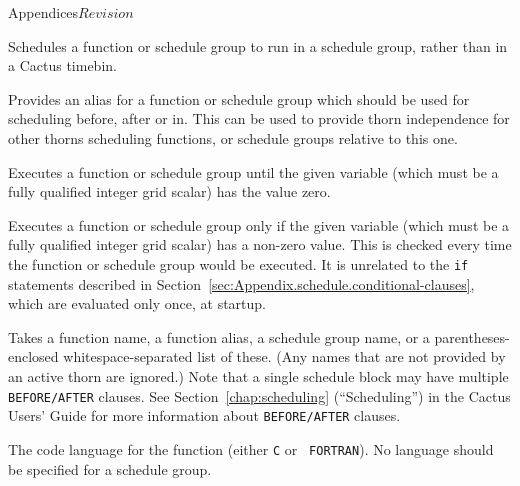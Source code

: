 \begin{cactuspart}{Appendices}{}{$Revision$}
\begin{Lentry}
  \item[{\tt IN}] Schedules a function or schedule group to run in a
  schedule group, rather than in a Cactus timebin.

  \item[{\tt AS}] Provides an alias for a function or schedule group
  which should be used for scheduling before, after or in.  This can
  be used to provide thorn independence for other thorns scheduling
  functions, or schedule groups relative to this one.

  \item[{\tt WHILE}] Executes a function or schedule group until the given
    variable (which must be a fully qualified integer grid scalar) has
    the value zero.

  \item[{\tt IF}] Executes a function or schedule group only if the given
    variable (which must be a fully qualified integer grid scalar) has
    a non-zero value. This is checked every time the function or schedule
    group would be executed. It is unrelated to the {\tt if} statements
    described in Section~\ref{sec:Appendix.schedule.conditional-clauses},
    which are evaluated only once, at startup.

  \item[{\tt BEFORE/AFTER}] Takes a function name, a function alias,
  a schedule group name, or a parentheses-enclosed whitespace-separated
  list of these.  (Any names that are not provided by an active thorn
  are ignored.)  Note that a single schedule block may have multiple
  {\tt BEFORE/AFTER} clauses.
  See Section~\ref{chap:scheduling}
  (``Scheduling'') in the Cactus Users' Guide for more information
  about {\tt BEFORE/AFTER} clauses.

  \item[{\tt LANG}] The code language for the function (either {\tt C} or {\tt
    FORTRAN}). No language should be specified for a schedule group.


\end{Lentry}
\end{cactuspart}
